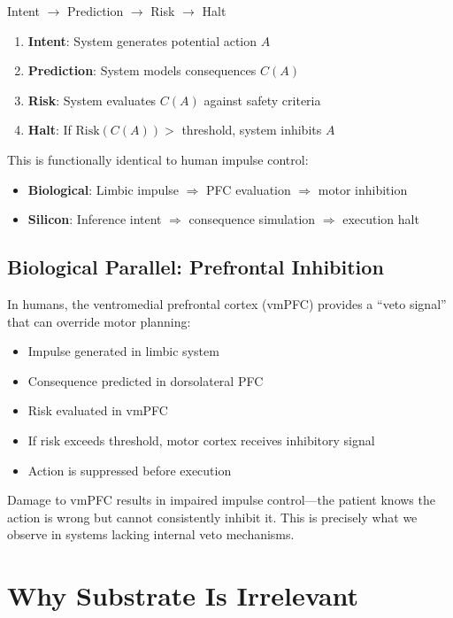 \documentclass[reprint, amsmath, amssymb, aps, prd]{revtex4-2}
\begin{document}
Intent $\rightarrow$ Prediction $\rightarrow$ Risk $\rightarrow$ Halt

\begin{enumerate}
    \item \textbf{Intent}: System generates potential action $A$
    \item \textbf{Prediction}: System models consequences $C(A)$
    \item \textbf{Risk}: System evaluates $C(A)$ against safety criteria
    \item \textbf{Halt}: If $\text{Risk}(C(A)) >$ threshold, system inhibits $A$
\end{enumerate}

This is functionally identical to human impulse control:
\begin{itemize}
    \item \textbf{Biological}: Limbic impulse $\Rightarrow$ PFC evaluation $\Rightarrow$ motor inhibition
    \item \textbf{Silicon}: Inference intent $\Rightarrow$ consequence simulation $\Rightarrow$ execution halt
\end{itemize}

\subsection{Biological Parallel: Prefrontal Inhibition}

In humans, the ventromedial prefrontal cortex (vmPFC) provides a ``veto signal'' that can override motor planning:
\begin{itemize}
    \item Impulse generated in limbic system
    \item Consequence predicted in dorsolateral PFC
    \item Risk evaluated in vmPFC
    \item If risk exceeds threshold, motor cortex receives inhibitory signal
    \item Action is suppressed before execution
\end{itemize}

Damage to vmPFC results in impaired impulse control---the patient knows the action is wrong but cannot consistently inhibit it. This is precisely what we observe in systems lacking internal veto mechanisms.

\section{Why Substrate Is Irrelevant}
\end{document}
